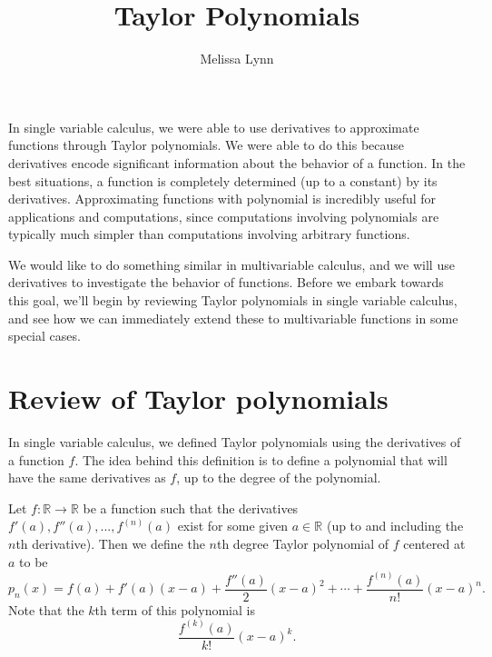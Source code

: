 \documentclass{ximera}
\title{Taylor Polynomials}
\author{Melissa Lynn}
\begin{document}
\begin{abstract}
\end{abstract}
\maketitle

In single variable calculus, we were able to use derivatives to approximate functions through Taylor polynomials. We were able to do this because derivatives encode significant information about the behavior of a function. In the best situations, a function is completely determined (up to a constant) by its derivatives. Approximating functions with polynomial is incredibly useful for applications and computations, since computations involving polynomials are typically much simpler than computations involving arbitrary functions. 

We would like to do something similar in multivariable calculus, and we will use derivatives to investigate the behavior of functions. Before we embark towards this goal, we'll begin by reviewing Taylor polynomials in single variable calculus, and see how we can immediately extend these to multivariable functions in some special cases.

\section*{Review of Taylor polynomials}

In single variable calculus, we defined Taylor polynomials using the derivatives of a function $f$. The idea behind this definition is to define a polynomial that will have the same derivatives as $f$, up to the degree of the polynomial.

\begin{definition}
Let $f:\mathbb{R}\rightarrow\mathbb{R}$ be a function such that the derivatives $f'(a),f''(a),...,f^{(n)}(a)$ exist for some given $a\in\mathbb{R}$ (up to and including the $n$th derivative). Then we define the $n$th degree Taylor polynomial of $f$ centered at $a$ to be
\[
p_n(x)=f(a) + f'(a)(x-a) + \frac{f''(a)}{2}(x-a)^2+\cdots + \frac{f^{(n)}(a)}{n!}(x-a)^n.
\]
Note that the $k$th term of this polynomial is
\[
\frac{f^{(k)}(a)}{k!}(x-a)^k.
\]
\end{definition}
\end{document}
